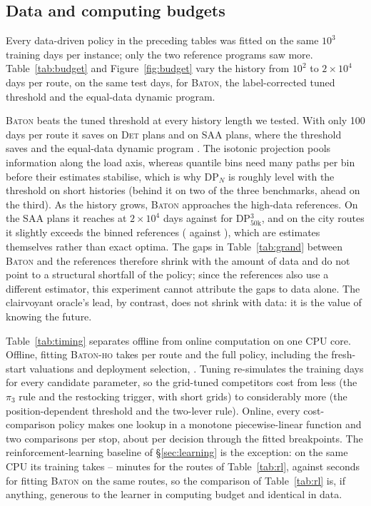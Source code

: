 \documentclass[preprint,authoryear,12pt]{elsarticle}
\theoremstyle{definition}
\theoremstyle{remark}
\begin{document}



\subsection{Data and computing budgets}\label{sec:budget}

Every data-driven policy in the preceding tables was fitted on the same
$10^3$ training days per instance; only the two reference programs saw
more. Table~\ref{tab:budget} and Figure~\ref{fig:budget} vary the
history from $10^2$ to $2\times10^4$ days per route, on the same test
days, for \textsc{Baton}, the label-corrected tuned threshold and the
equal-data dynamic program.

\textsc{Baton} beats the tuned threshold at every history length we
tested. With only 100 days per route it saves \budDethDetSmall{} on
\textsc{Det} plans and \budDethSaaSmall{} on \textsc{SAA} plans, where
the threshold saves \budDethSaaThrSmall{} and the equal-data dynamic
program \budDethSaaDpNSmall. The isotonic projection pools information along
the load axis, whereas quantile bins need many paths per bin before
their estimates stabilise, which is why DP$_N$ is roughly level with the
threshold on short histories (behind it on two of the three benchmarks,
ahead on the third). As the history grows, \textsc{Baton}
approaches the high-data references. On the \textsc{SAA} plans it
reaches \budDethSaaLarge{} at $2\times10^4$ days against
\budDethSaaDpThree{} for DP$^3_{50\mathrm{k}}$, and on the city routes it
slightly exceeds the binned references (\budCityLarge{} against
\budCityDp{}), which are estimates themselves rather than exact optima.
The gaps in Table~\ref{tab:grand} between \textsc{Baton} and the
references therefore shrink with the amount of data and do not point to a
structural shortfall of the policy; since the references also use a
different estimator, this experiment cannot attribute the gaps to data
alone. The clairvoyant
oracle's lead, by contrast, does not shrink with data: it is the value
of knowing the future.

Table~\ref{tab:timing} separates offline from online computation on one
CPU core. Offline, fitting \textsc{Baton-ho} takes \timeBatonHoMs{} per
route and the full policy, including the fresh-start valuations and
deployment selection, \timeBatonMs. Tuning re-simulates the training
days for every candidate parameter, so the grid-tuned competitors cost
from less (the $\pi_3$ rule and the restocking trigger, with
short grids) to considerably more (the position-dependent threshold and
the two-lever rule). Online, every cost-comparison policy makes one
lookup in a monotone piecewise-linear function and two comparisons per
stop, about \timeOnlineUs{} per decision through the fitted breakpoints.
The reinforcement-learning baseline of \S\ref{sec:learning} is the
exception: on the same CPU its training takes \rlTrainMin--\rlTrainMax{}
minutes for the \nRL{} routes of Table~\ref{tab:rl}, against
\rlBatonFitS{} seconds for fitting \textsc{Baton} on the same routes, so
the comparison of Table~\ref{tab:rl} is, if anything, generous to the
learner in computing budget and identical in data.
\end{document}

